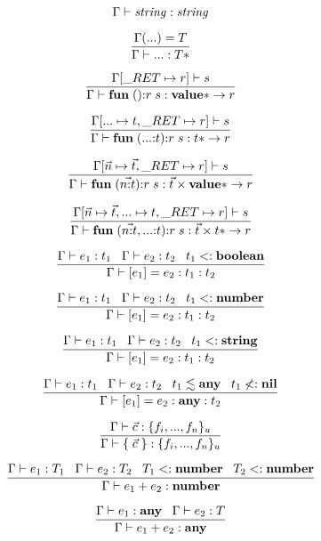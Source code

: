 \[
\Gamma \vdash {\it string}:{\it string}
\]

\[
\dfrac{\Gamma({...}) = T}
      {\Gamma \vdash {...}:T{*}}
\]

\[
\dfrac{\env[\ret \mapsto r] \vdash s}
      {\env \vdash \mathbf{fun} \; (){:}r \; s:\Value{*} \rightarrow r}
\]

\[
\dfrac{\env[{...} \mapsto t, \ret \mapsto r] \vdash s}
      {\env \vdash \mathbf{fun} \; ({...}{:}t){:}r \; s:t{*} \rightarrow r}
\]

\[
\dfrac{\env[\vec{n} \mapsto \vec{t}, \ret \mapsto r] \vdash s}
      {\env \vdash \mathbf{fun} \; (\vec{n{:}t}){:}r \; s:\vec{t} \times \Value{*} \rightarrow r}
\]

\[
\dfrac{\env[\vec{n} \mapsto \vec{t}, {...} \mapsto t, \ret \mapsto r] \vdash s}
      {\env \vdash \mathbf{fun} \; (\vec{n{:}t},{...}{:}t){:}r \; s: \vec{t} \times t{*} \rightarrow r}
\]

\[
\dfrac{\Gamma \vdash e_{1}:t_{1} \;\;\;
       \Gamma \vdash e_{2}:t_{2} \;\;\;
       t_{1} <: \mathbf{boolean}}
      {\Gamma \vdash [e_{1}] = e_{2}:t_{1}:t_{2}}
\]

\[
\dfrac{\Gamma \vdash e_{1}:t_{1} \;\;\;
       \Gamma \vdash e_{2}:t_{2} \;\;\;
       t_{1} <: \mathbf{number}}
      {\Gamma \vdash [e_{1}] = e_{2}:t_{1}:t_{2}}
\]

\[
\dfrac{\Gamma \vdash e_{1}:t_{1} \;\;\;
       \Gamma \vdash e_{2}:t_{2} \;\;\;
       t_{1} <: \mathbf{string}}
      {\Gamma \vdash [e_{1}] = e_{2}:t_{1}:t_{2}}
\]

\[
\dfrac{\Gamma \vdash e_{1}:t_{1} \;\;\;
       \Gamma \vdash e_{2}:t_{2} \;\;\;
       t_{1} \lesssim \mathbf{any} \;\;\;
       t_{1} \not<: \mathbf{nil}}
      {\Gamma \vdash [e_{1}] = e_{2}:\mathbf{any}:t_{2}}
\]

\[
\dfrac{\Gamma \vdash \vec{c}:\{ f_{i}, ..., f_{n} \}_{u}}
      {\Gamma \vdash \{ \; \vec{c} \; \}:\{ f_{i}, ..., f_{n} \}_{u}}
\]

\[
\dfrac{\Gamma \vdash e_{1}:T_{1} \;\;\;
       \Gamma \vdash e_{2}:T_{2} \;\;\;
       T_{1} <: \mathbf{number} \;\;\;
       T_{2} <: \mathbf{number}}
      {\Gamma \vdash e_{1} + e_{2}:\mathbf{number}}
\]

\[
\dfrac{\Gamma \vdash e_{1}:\mathbf{any} \;\;\;
       \Gamma \vdash e_{2}:T}
      {\Gamma \vdash e_{1} + e_{2}:\mathbf{any}}
\]

